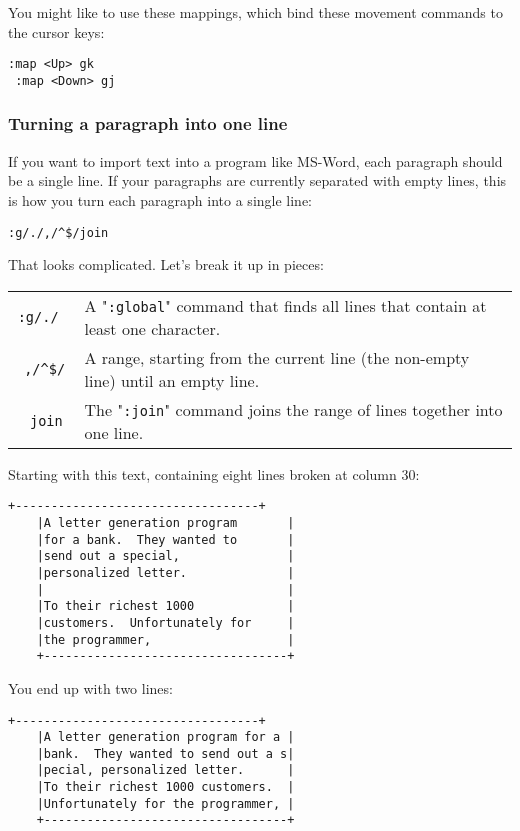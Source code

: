 You might like to use these mappings, which bind these movement commands to the cursor keys:

\begin{Verbatim}[samepage=true]
 :map <Up> gk
 :map <Down> gj
\end{Verbatim}
\subsubsection{Turning a paragraph into one line}
If you want to import text into a program like MS-Word, each paragraph should be a single line.
If your paragraphs are currently separated with empty lines, this is how you turn each paragraph into a single line:

\begin{Verbatim}[samepage=true]
 :g/./,/^$/join
\end{Verbatim}

That looks complicated.
Let's break it up in pieces:

\begin{center} \begin{tabular}{c l}
				\texttt{:g/./         } & A "\texttt{:global}" command that finds all lines that contain at least one character. \\
				\texttt{     ,/\^{}\$/    } & A range, starting from the current line (the non-empty line) until an empty line. \\
				\texttt{          join} & The "\texttt{:join}" command joins the range of lines together into one line. \\
\end{tabular} \end{center}

Starting with this text, containing eight lines broken at column 30:

\begin{Verbatim}[samepage=true]
    +----------------------------------+
    |A letter generation program       |
    |for a bank.  They wanted to       |
    |send out a special,               |
    |personalized letter.              |
    |                                  |
    |To their richest 1000             |
    |customers.  Unfortunately for     |
    |the programmer,                   |
    +----------------------------------+
\end{Verbatim}

You end up with two lines:

\begin{Verbatim}[samepage=true]
    +----------------------------------+
    |A letter generation program for a |
    |bank.  They wanted to send out a s|
    |pecial, personalized letter.      |
    |To their richest 1000 customers.  |
    |Unfortunately for the programmer, |
    +----------------------------------+
\end{Verbatim}

